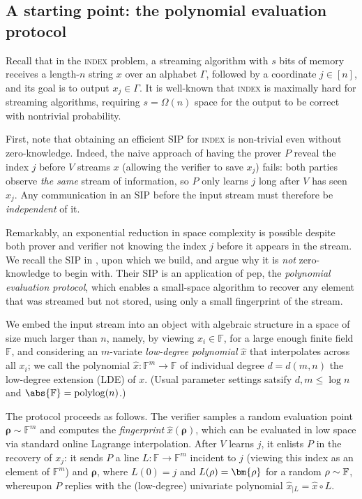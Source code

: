 \documentclass[a4paper,UKenglish,cleveref, autoref, thm-restate]{lipics-v2021}
\theoremstyle{definition}
\newcommand{\field}{\mathbb{F}}
\newcommand{\polylog}{\operatorname{polylog}}
\newcommand{\indexproblem}{\normalfont\textsc{index}\xspace}
\newcommand{\pepprotocol}{\textsf{pep}\xspace}
\newcommand{\dimension}{m}
\newcommand{\degree}{d}
\newcommand{\fingerprinttuple}{\bm{\rho}}
\renewcommand{\line}{L}
\newcommand{\alphabet}{\Gamma}
\def\rfe#1{
    \ifnum#1=1
        \rho
    \else
    \ifnum#1=2
        \sigma
    \else
    \fi\fi
}
\begin{document}
      
\subsection{A starting point: the polynomial evaluation protocol}
\label{sec-to:pep}

    Recall that in the \indexproblem problem, a streaming algorithm with $s$ bits of memory receives a length-$n$ string $x$ over an alphabet $\alphabet$, followed by a coordinate $j \in [n]$, and its goal is to output $x_j \in \alphabet$. It is well-known that \indexproblem is maximally hard for streaming algorithms, requiring $s = \Omega(n)$ space for the output to be correct with nontrivial probability.
    
    First, note that obtaining an efficient SIP for \indexproblem is non-trivial even without zero-knowledge. Indeed, the naive approach of having the prover $P$ reveal the index $j$ before $V$ streams $x$ (allowing the verifier to save $x_j$) fails: both parties observe \emph{the same} stream of information, so $P$ only learns $j$ long after $V$ has seen $x_j$. Any communication in an SIP before the input stream must therefore be \emph{independent} of it.
    
    Remarkably, an exponential reduction in space complexity is possible despite both prover and verifier not knowing the index $j$ before it appears in the stream. We recall the SIP in \cite{CCMTV19}, upon which we build, and argue why it is \emph{not} zero-knowledge to begin with. Their SIP is an application of \pepprotocol, the \emph{polynomial evaluation protocol}, which enables a small-space algorithm to recover any element that was streamed but not stored, using only a small fingerprint of the stream.

    We embed the input stream into an object with algebraic structure in a space of size much larger than $n$, namely, by viewing $x_i \in \field$, for a large enough finite field $\field$, and considering an $\dimension$-variate \emph{low-degree polynomial} $\hat x$ that interpolates across all $x_i$; we call the polynomial $\hat x: \field^\dimension \to \field$ of individual degree $\degree = \degree(\dimension, n)$ the low-degree extension (LDE) of $x$. (Usual parameter settings satsify $\degree, \dimension \leq \log n$ and $\abs{\field} = \polylog(n)$.)
    
    The protocol proceeds as follows. The verifier samples a random evaluation point $\fingerprinttuple \sim \field^\dimension$ and computes the \emph{fingerprint} $\hat x(\fingerprinttuple)$, which can be evaluated in low space via standard online Lagrange interpolation. After $V$ learns $j$, it enlists $P$ in the recovery of $x_j$: it sends $P$ a line $\line: \field \to \field^\dimension$ incident to $j$ (viewing this index as an element of $\field^\dimension$) and $\fingerprinttuple$, where $\line(0) = j$ and $\line(\rfe1) = \fingerprinttuple$ for a random $\rfe1 \sim \field$, whereupon $P$ replies with the (low-degree) univariate polynomial $\hat x_{|\line} = \hat x \circ \line$.
    
\end{document}

